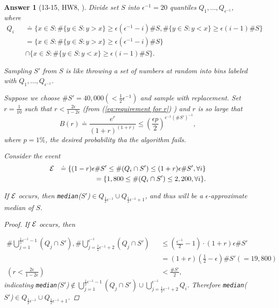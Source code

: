 \documentclass[11pt]{article}
\theoremstyle{numberplain}
\theoremstyle{nonumberplain}
\newtheorem{proof}{Proof}
\newtheorem{ans}{Answer}
\newcommand{\0}{{\mathbf{0}}}
\begin{document}
\begin{ans}[13-15, HW8, \cite{solcornell}] 
\def\ev{{\cal E}}
Divide set $S$ into $\epsilon^{-1}=20$ {\em quantiles}
$Q_1, \ldots, Q_{\epsilon^{-1}}$, where 
\begin{eqnarray}
Q_i &&  \doteq \{x\in S:\# \{y\in S:y> x\}\geq \epsilon (\epsilon^{-1}-i) \# S , \# \{y\in S:y< x\}\geq \epsilon (i-1) \# S \} \nonumber 	\\
&& = \{x\in S:\# \{y\in S:y> x\}\geq \epsilon (\epsilon^{-1}-i) \# S\} \nonumber\\
&& \cap  \{x\in S:\# \{y\in S:y< x\}\geq \epsilon (i-1) \# S \}. \label{eq:defi of Qi}
\end{eqnarray}


Sampling $S'$ from $S$ is like throwing a set of numbers at random into bins labeled with $Q_1, \ldots, Q_{\epsilon^{-1}}$.

Suppose we choose $\#S' = 40,000( <\frac12 \epsilon^{-1})$ and sample with replacement. Set $r=\frac{1}{10}$ such that $r <  \frac{2\epsilon}{1-2\epsilon}$ (from (\ref{eq:requirement for r}) ) and $r$  is so large that
\begin{equation}
B(r)\doteq \frac{e^r}{(1+r)^{(1+r)}}\leq \left( \frac{\epsilon p}{2} \right)^{\epsilon^{-1}(\# S')^{-1}},
\label{eq:condition for r}
\end{equation}
where $p=1\%$, the desired probability tha the algorithm fails. 


Consider the event 
\begin{eqnarray*}
\ev && \doteq \{(1-r) \epsilon \#S' \leq \#(Q_i\cap S')\leq (1+r)\epsilon\# S',\forall i\}\\
&& =\{1,800 \leq \#(Q_i\cap S')\leq  2,200,\forall i\}.
\end{eqnarray*}

\begin{claim}If $\ev$ occurs, then
{\tt median}($S'$)$\in Q_{\frac12\epsilon^{-1}} \cup Q_{\frac12 \epsilon^{-1}+1}$,
and thus will be a $\epsilon$-approximate median of $S$.
\end{claim}

\begin{proof}
If $\ev$ occurs, then

\begin{eqnarray}
\#\bigcup_{j=1}^{\frac12\epsilon^{-1}-1} \left(Q_j\cap S'\right), \#\bigcup_{j=\frac12 \epsilon^{-1}+2}^{\epsilon^{-1}} \left(Q_j\cap S'\right)&& \leq \left(\frac{\epsilon^{-1}}{2}-1\right)\cdot (1+r)\epsilon\# S'
\nonumber\\
&& = (1+r) \left(\frac{1}{2}-\epsilon \right) \# S'(=19,800) 
\nonumber\\
(r <  \frac{2\epsilon}{1-2\epsilon})  &&<\frac{\# S'}{2},  \label{eq:requirement for r}
\end{eqnarray}
indicating {\tt median}($S'$)$\notin \bigcup_{j=1}^{\frac12\epsilon^{-1}-1}\left(Q_j\cap S'\right)\cup  \bigcup_{j=\frac12 \epsilon^{-1}+2}^{\epsilon^{-1}}Q_i$.
Therefore {\tt median}($S'$)$\in Q_{\frac12\epsilon^{-1}} \cup Q_{\frac12 \epsilon^{-1}+1}$.
\end{proof}


\end{ans}
\end{document}
